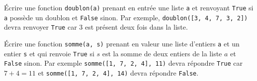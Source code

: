 \documentclass{magnoliaold}
\begin{document}
Écrire une fonction \verb!doublon(a)! prenant en entrée une liste \verb!a! et renvoyant \verb_True_
si \verb_a_ possède un doublon et \verb_False_ sinon. Par exemple, \verb_doublon([3, 4, 7, 3, 2])_
devra renvoyer \verb_True_ car 3 est présent deux fois dans la liste.

Écrire une fonction \verb!somme(a, s)! prenant en valeur une liste d'entiers \verb!a! et un entier \verb!s!
et qui renvoie \verb_True_ si $s$ est la somme de deux entiers de la liste $a$ et \verb!False! sinon.
Par exemple \verb!somme([1, 7, 2, 4], 11)! devra répondre \verb!True! car $7+4=11$ et
\verb!somme([1, 7, 2, 4], 14)! devra répondre \verb!False!.




\end{document}
